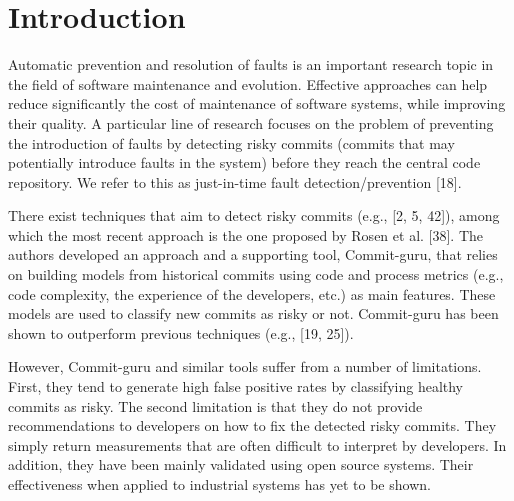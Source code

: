 \documentclass[sigconf]{acmart}
\begin{document}


\maketitle

\section{Introduction}\label{sec:introduction}

Automatic prevention and resolution of faults is an important research
topic in the field of software maintenance and evolution. Effective
approaches can help reduce significantly the cost of maintenance of
software systems, while improving their quality. A particular line of
research focuses on the problem of preventing the introduction of faults
by detecting risky commits (commits that may potentially introduce
faults in the system) before they reach the central code repository. We
refer to this as just-in-time fault detection/prevention [18].

There exist techniques that aim to detect risky commits (e.g., [2, 5,
42]), among which the most recent approach is the one proposed by
Rosen et al. [38]. The authors developed an approach and a
supporting tool, Commit-guru, that relies on building models from
historical commits using code and process metrics (e.g., code
complexity, the experience of the developers, etc.) as main features.
These models are used to classify new commits as risky or not.
Commit-guru has been shown to outperform previous techniques (e.g.,
[19, 25]).

However, Commit-guru and similar tools suffer from a number of
limitations. First, they tend to generate high false positive rates by
classifying healthy commits as risky. The second limitation is that they
do not provide recommendations to developers on how to fix the detected
risky commits. They simply return measurements that are often difficult
to interpret by developers. In addition, they have been mainly validated
using open source systems. Their effectiveness when applied to
industrial systems has yet to be shown.
\end{document}
